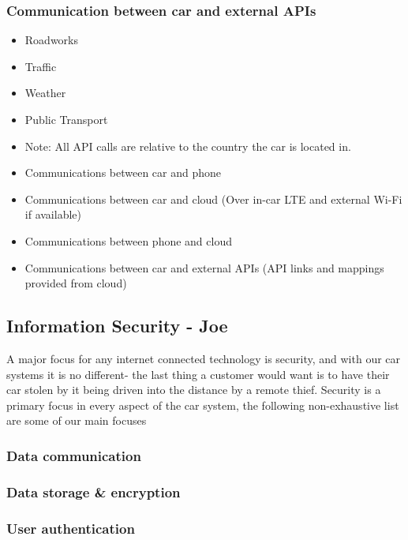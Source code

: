 \documentclass{article}
\begin{document}
\subsubsection{Communication between car and external APIs}
\begin{itemize}
  \item Roadworks
  \item Traffic
  \item Weather
  \item Public Transport
  \item Note: All API calls are relative to the country the car is located in.
\end{itemize}

\begin{itemize}
  \item Communications between car and phone

  \item Communications between car and cloud (Over in-car LTE and external Wi-Fi if available)

  \item Communications between phone and cloud

  \item Communications between car and external APIs (API links and mappings provided from cloud)
\end{itemize}

\subsection{Information Security - Joe}\label{ssec:information-security}
A major focus for any internet connected technology is security, and with our car systems it is no different- the last thing a customer would want is to have their car stolen by it being driven into the distance by a remote thief. Security is a primary focus in every aspect of the car system, the following non-exhaustive list are some of our main focuses

\subsubsection{Data communication}
\subsubsection{Data storage \& encryption}
\subsubsection{User authentication}
\end{document}
